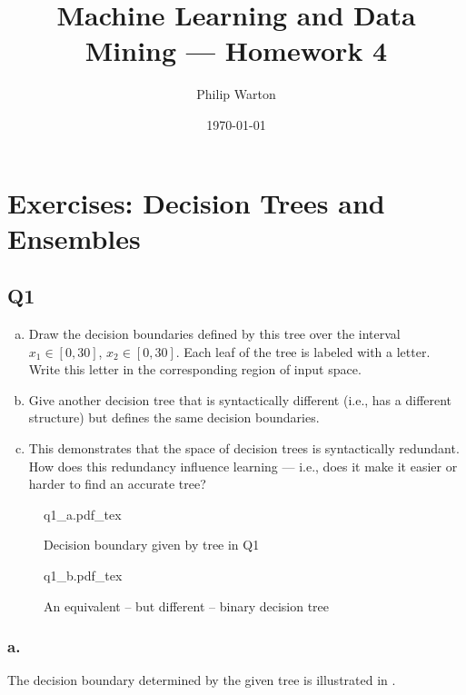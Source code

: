 \documentclass{article}
\newcommand{\incfig}[1]{%
    \def\svgwidth{.8\columnwidth}
    {#1.pdf_tex} 
}
\theoremstyle{definition}
\begin{document}
\title{Machine Learning and Data Mining --- Homework 4}
\author{Philip Warton}
\date{\today}
\maketitle
\section{Exercises: Decision Trees and Ensembles}
    \subsection*{Q1}
        \begin{mdframed}
            \begin{enumerate}[a.]
                \item Draw the decision boundaries defined by this tree over the interval $x_1 \in [0, 30]$, $x_2 \in[0, 30]$. Each leaf of
                the tree is labeled with a letter. Write this letter in the corresponding region of input space.
                \item Give another decision tree that is syntactically different (i.e., has a different structure) but defines the
                same decision boundaries.
                \item This demonstrates that the space of decision trees is syntactically redundant. How does this redundancy
                influence learning --- i.e., does it make it easier or harder to find an accurate tree?
            \end{enumerate}
        \end{mdframed}
        \begin{figure}[ht]
            \centering
            \begin{minipage}{.5\textwidth}
                \centering
                \incfig{q1_a}
                \caption{Decision boundary given by tree in Q1}
                \label{fig:}
            \end{minipage}%
            \begin{minipage}{.5\textwidth}
                \centering
                \incfig{q1_b}
                \caption{An equivalent -- but different -- binary decision tree}
                \label{fig:}
            \end{minipage}
        \end{figure}
        \subsubsection*{a.}
        The decision boundary determined by the given tree is illustrated 
        in .
\end{document}

